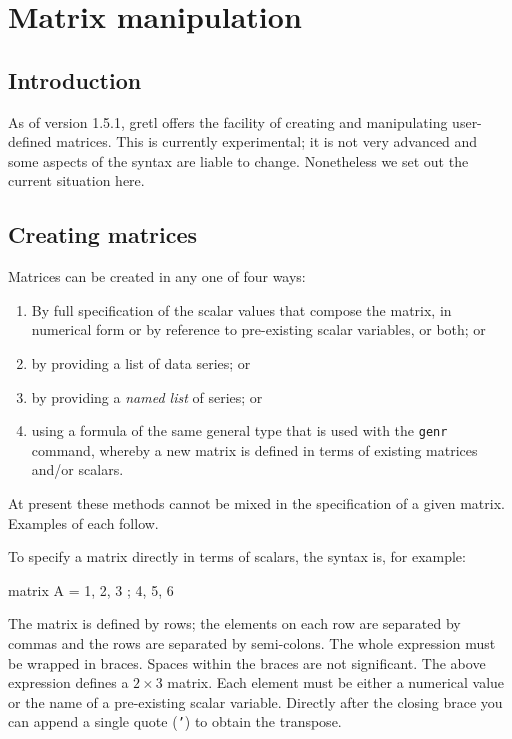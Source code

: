 \chapter{Matrix manipulation}
\label{chap-matrices}

\section{Introduction}
\label{matrix-intro}

As of version 1.5.1, gretl offers the facility of creating and
manipulating user-defined matrices.  This is currently experimental;
it is not very advanced and some aspects of the syntax are liable to
change.  Nonetheless we set out the current situation here.

\section{Creating matrices}
\label{matrix-create}

Matrices can be created in any one of four ways:

\begin{enumerate}
\item By full specification of the scalar values that compose the
  matrix, in numerical form or by reference to pre-existing
  scalar variables, or both; or
\item by providing a list of data series; or
\item by providing a \textit{named list} of series; or
\item using a formula of the same general type that is used
  with the \texttt{genr} command, whereby a new matrix is defined
  in terms of existing matrices and/or scalars.
\end{enumerate}

At present these methods cannot be mixed in the specification of a
given matrix.  Examples of each follow.

To specify a matrix directly in terms of scalars, the syntax is,
for example: 

\begin{code}
matrix A = { 1, 2, 3 ; 4, 5, 6 }
\end{code}

The matrix is defined by rows; the elements on each row are separated
by commas and the rows are separated by semi-colons.  The whole
expression must be wrapped in braces.  Spaces within the braces are
not significant.  The above expression defines a $2\times3$ matrix.
Each element must be either a numerical value or the name of a
pre-existing scalar variable.  Directly after the closing brace you
can append a single quote (\texttt{'}) to obtain the transpose.

